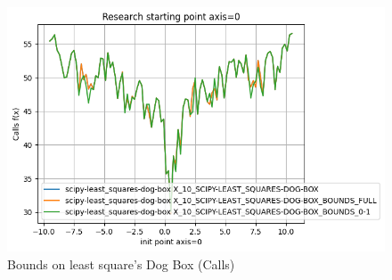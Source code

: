 \documentclass[12pt, a4paper, oneside, final]{article}
\begin{document}
	\begin{figure}[H]
		\centering
		\includegraphics[scale = 1]{Image/T2C_DOG-BOX_CALLS.png}
		\caption*{Bounds on least square's Dog Box (Calls)}
	\end{figure}
\end{document}
